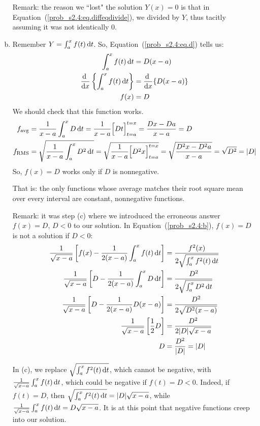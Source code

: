 \begin{solution}
\begin{enumerate}[(a)]
Remark: the reason we ``lost" the solution $Y(x)=0$ is that in Equation~(\ref{prob_s2.4:eq.diffeqdivide}), we divided by $Y$, thus tacitly assuming it was not identically 0.
\item  Remember $Y=\int_a^x f(t)\,\mathrm{d}t$. So, Equation~(\ref{prob_s2.4:eq.d}) tells us:
 \begin{align*}
\int_a^x f(t)\,\dee{t}&=D(x-a)\\
\diff{}{x}\left\{\int_a^x f(t)\,\dee{t}\right\}&=\diff{}{x}\{D(x-a)\}\\
f(x)&=D
\end{align*}
We should check that this function works.
\begin{align*}
f_{\text{avg}} &= \frac{1}{x-a}\int_a^x D\,\mathrm{d}t = \frac{1}{x-a}\Big[Dt\Big]_{t=a}^{t=x} = \frac{Dx-Da}{x-a}=D\\
f_{\text{RMS}} &= \sqrt{\frac{1}{x-a}\int_a^x D^2\,\mathrm{d}t}
=\sqrt{\frac{1}{x-a}\Big[D^2x\Big]_{t=a}^{t=x}}=\sqrt{\frac{D^2x-D^2a}{x-a}}=\sqrt{D^2}=|D|
\end{align*}
So, $f(x)=D$ works only if $D$ is nonnegative.

That is: the only functions whose average matches their root square mean over every interval are constant, nonnegative functions.

Remark: it was step (c) where we introduced the erroneous answer $f(x)=D$, $D<0$ to our solution. In Equation~(\ref{prob_s2.4:b}), $f(x)=D$ is not a solution if $D<0$:
\begin{align*}
\frac{1}{\sqrt{x-a}}\left[f(x) - \frac{1}{2(x-a)}\int_a^x f(t)\,\mathrm{d}t\right]&=\frac{f^2(x)}{2\sqrt{\int_a^x f^2(t)\,\mathrm{d}t}}\\
\frac{1}{\sqrt{x-a}}\left[D - \frac{1}{2(x-a)}\int_a^x D\,\mathrm{d}t\right]&=\frac{D^2}{2\sqrt{\int_a^x D^2\,\mathrm{d}t}}\\
\frac{1}{\sqrt{x-a}}\left[D - \frac{1}{2(x-a)}D(x-a)\right]&=\frac{D^2}{2\sqrt{ D^2(x-a)}}\\
\frac{1}{\sqrt{x-a}}\left[\frac{1}{2}D \right]&=\frac{D^2}{2|D|\sqrt{x-a}}\\
D&=\frac{D^2}{|D|}=|D|
\end{align*}

In (c), we replace $\sqrt{\int_a^x f^2(t)\,\mathrm{d}t}$, which cannot be negative, with $\frac{1}{\sqrt{x-a}}\int_a^x f(t)\,\mathrm{d}t$, which could be negative if $f(t)=D<0$. Indeed, if $f(t)=D$, then
$\sqrt{\int_a^x f^2(t)\,\mathrm{d}t}  = |D|\sqrt{x-a}$, while
$\frac{1}{\sqrt{x-a}}\int_a^x f(t)\,\mathrm{d}t=D\sqrt{x-a}$.
It is at this point that negative functions creep into our solution.
\end{enumerate}
\end{solution}





